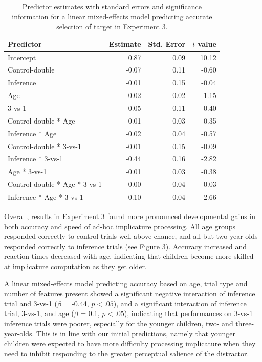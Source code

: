 \documentclass[a4paper,man,apacite,floatsintext]{apa6}
\begin{document}
\begin{table}[tb]
\centering
\begin{tabular}{lrrr}
 Predictor & Estimate & Std. Error & $t$ value \\ 
  \hline
Intercept & 0.87 & 0.09 & 10.12 \\ 
  Control-double & -0.07 & 0.11 & -0.60 \\ 
  Inference & -0.01 & 0.15 & -0.04 \\ 
  Age & 0.02 & 0.02 & 1.15 \\ 
  3-vs-1 & 0.05 & 0.11 & 0.40 \\ 
  Control-double * Age & 0.01 & 0.03 & 0.35 \\ 
  Inference * Age & -0.02 & 0.04 & -0.57 \\ 
  Control-double * 3-vs-1 & -0.01 & 0.15 & -0.09 \\ 
  Inference * 3-vs-1 & -0.44 & 0.16 & -2.82 \\ 
  Age * 3-vs-1 & -0.01 & 0.03 & -0.38 \\ 
  Control-double * Age * 3-vs-1 & 0.00 & 0.04 & 0.03 \\ 
  Inference * Age * 3-vs-1 & 0.10 & 0.04 & 2.66 \\ 
   \hline
\end{tabular}
\caption{Predictor estimates with standard errors and significance information for a linear mixed-effects model predicting accurate selection of target in Experiment 3.} 
\label{tab:exp3_tab}
\end{table}

Overall, results in Experiment 3 found more pronounced developmental
gains in both accuracy and speed of ad-hoc implicature processing. All
age groups responded correctly to control trials well above chance, and
all but two-year-olds responded correctly to inference trials (see
Figure 3). Accuracy increased and reaction times decreased with age,
indicating that children become more skilled at implicature computation
as they get older.

A linear mixed-effects model predicting accuracy based on age, trial
type and number of features present showed a significant negative
interaction of inference trial and 3-vs-1 (\(\beta\) = -0.44,
\(p <.05\)), and a significant interaction of inference trial, 3-vs-1,
and age (\(\beta\) = 0.1, \(p <.05\)), indicating that performances on
3-vs-1 inference trials were poorer, especially for the younger
children, two- and three-year-olds. This is in line with our initial
predictions, namely that younger children were expected to have more
difficulty processing implicature when they need to inhibit responding
to the greater perceptual salience of the distractor.
\end{document}
